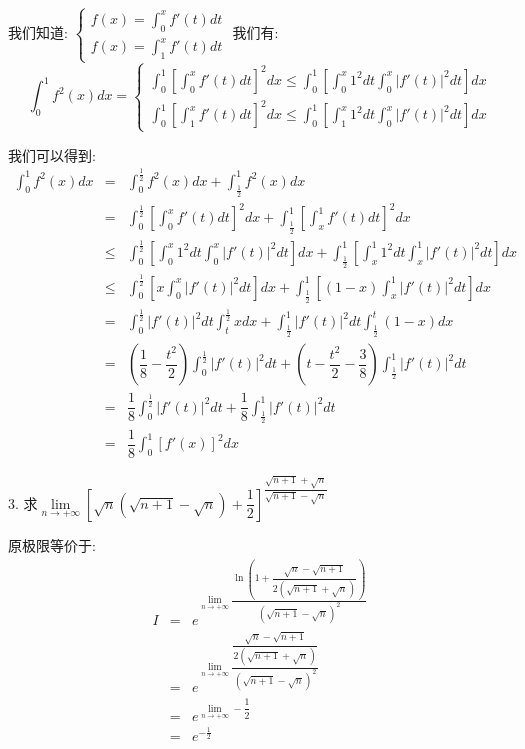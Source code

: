 \begin{solution}

	我们知道:  $\left\lbrace
	\begin{array}{l}
		f(x)=\int_{0}^{x}f'(t)dt\\
		f(x)=\int_{1}^{x}f'(t)dt
	\end{array}
	\right. $
	我们有:  $$\int_{0}^{1}f^{2}(x)dx=\left\lbrace
	\begin{array}{l}
		\int_{0}^{1}\left[\int_{0}^{x}f'(t)dt \right]^2dx\leq \int_{0}^{1}[\int_{0}^{x}1^2dt\int_{0}^{x}|f'(t)|^2dt]dx\\
		\int_{0}^{1}\left[\int_{1}^{x}f'(t)dt \right]^2dx\leq \int_{0}^{1}[\int_{1}^{x}1^2dt\int_{0}^{x}|f'(t)|^2dt]dx
	\end{array}
	\right.$$
	
	我们可以得到:  
	\begin{eqnarray*}
		\int_{0}^{1}f^{2}(x)dx&=&\int_{0}^{\frac{1}{2}}f^{2}(x)dx+\int_{\frac{1}{2}}^{1}f^{2}(x)dx\\
		&=&\int_{0}^{\frac{1}{2}}\left[\int_{0}^{x}f'(t)dt \right]^2dx+\int_{\frac{1}{2}}^{1}\left[\int_{x}^{1}f'(t)dt \right]^2dx\\
		&\leq&\int_{0}^{\frac{1}{2}}[\int_{0}^{x}1^2dt\int_{0}^{x}|f'(t)|^2dt]dx+\int_{\frac{1}{2}}^{1}[\int_{x}^{1}1^2dt\int_{x}^{1}|f'(t)|^2dt]dx\\
		&\leq&\int_{0}^{\frac{1}{2}}[x\int_{0}^{x}|f'(t)|^2dt]dx+\int_{\frac{1}{2}}^{1}[(1-x)\int_{x}^{1}|f'(t)|^2dt]dx\\
		&=&\int_{0}^{\frac{1}{2}}|f'(t)|^2dt\int_{t}^{\frac{1}{2}}xdx+\int_{\frac{1}{2}}^{1}|f'(t)|^2dt\int_{\frac{1}{2}}^{t}(1-x)dx\\
		&=&(\dfrac{1}{8}-\dfrac{t^2}{2})\int_{0}^{\frac{1}{2}}|f'(t)|^2dt+(t-\dfrac{t^2}{2}-\dfrac{3}{8})\int_{\frac{1}{2}}^{1}|f'(t)|^2dt\\
		&=&\dfrac{1}{8}\int_{0}^{\frac{1}{2}}|f'(t)|^2dt+\dfrac{1}{8}\int_{\frac{1}{2}}^{1}|f'(t)|^2dt\\
		&=&\dfrac{1}{8}\int_{0}^{1}[f'(x)]^2dx
	\end{eqnarray*}
\end{solution}

3. 求$\lim\limits_{n\rightarrow+\infty}\left[\sqrt{n}(\sqrt{n+1}-\sqrt{n})+\dfrac{1}{2} \right]^{\dfrac{\sqrt{n+1}+\sqrt{n}}{\sqrt{n+1}-\sqrt{n}}} $
\begin{solution}

	原极限等价于:  
	\begin{eqnarray*}
		I&=&e^{\lim\limits_{n\rightarrow+\infty}\dfrac{\ln\left( 1+\dfrac{\sqrt{n}-\sqrt{n+1}}{2(\sqrt{n+1}+\sqrt{n})}\right)}{(\sqrt{n+1}-\sqrt{n})^2}}\\
		&=&e^{\lim\limits_{n\rightarrow+\infty}\dfrac{\dfrac{\sqrt{n}-\sqrt{n+1}}{2(\sqrt{n+1}+\sqrt{n})}}{(\sqrt{n+1}-\sqrt{n})^2}}\\
		&=&e^{\lim\limits_{n\rightarrow+\infty}-\dfrac{1}{2}}\\
		&=&e^{-\frac{1}{2}}
	\end{eqnarray*}
\end{solution}


